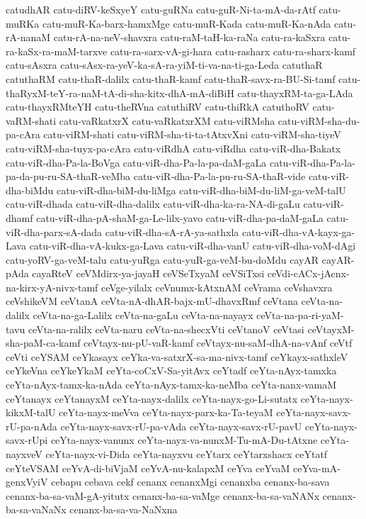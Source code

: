 {catudhAR
catu-diRV-keSxyeY
catu-guRNa
catu-guR-Ni-ta-mA-da-rAtf
catu-muRKa
catu-muR-Ka-barx-hamxMge
catu-muR-Kada
catu-muR-Ka-nAda
catu-rA-nanaM
catu-rA-na-neV-shavxra
catu-raM-taH-ka-raNa
catu-ra-kaSxra
catu-ra-kaSx-ra-maM-tarxve
catu-ra-sarx-vA-gi-hara
catu-rasharx
catu-ra-sharx-kamf
catu-sAsxra
catu-sAsx-ra-yeV-ka-sA-ra-yiM-ti-va-na-ti-ga-Leda
catuthaR
catuthaRM
catu-thaR-dalilx
catu-thaR-kamf
catu-thaR-savx-ra-BU-Si-tamf
catu-thaRyxM-teY-ra-naM-tA-di-sha-kitx-dhA-mA-diBiH
catu-thayxRM-ta-ga-LAda
catu-thayxRMteYH
catu-theRVna
catuthiRV
catu-thiRkA
catuthoRV
catu-vaRM-shati
catu-vaRkatxrX
catu-vaRkatxrXM
catu-viRMsha
catu-viRM-sha-du-pa-cAra
catu-viRM-shati
catu-viRM-sha-ti-ta-tAtxvXni
catu-viRM-sha-tiyeV
catu-viRM-sha-tuyx-pa-cAra
catu-viRdhA
catu-viRdha
catu-viR-dha-Bakatx
catu-viR-dha-Pa-la-BoVga
catu-viR-dha-Pa-la-pa-daM-gaLa
catu-viR-dha-Pa-la-pa-da-pu-ru-SA-thaR-veMba
catu-viR-dha-Pa-la-pu-ru-SA-thaR-vide
catu-viR-dha-biMdu
catu-viR-dha-biM-du-liMga
catu-viR-dha-biM-du-liM-ga-veM-talU
catu-viR-dhada
catu-viR-dha-dalilx
catu-viR-dha-ka-ra-NA-di-gaLu
catu-viR-dhamf
catu-viR-dha-pA-shaM-ga-Le-lilx-yavo
catu-viR-dha-pa-daM-gaLa
catu-viR-dha-parx-sA-dada
catu-viR-dha-sA-rA-ya-sathxla
catu-viR-dha-vA-kayx-ga-Lava
catu-viR-dha-vA-kukx-ga-Lava
catu-viR-dha-vanU
catu-viR-dha-voM-dAgi
catu-yoRV-ga-veM-talu
catu-yuRga
catu-yuR-ga-veM-bu-doMdu
cayAR
cayAR-pAda
cayaRteV
ceVMdirx-ya-jayaH
ceVSeTxyaM
ceVSiTxsi
ceVdi-cACx-jAcnx-na-kirx-yA-nivx-tamf
ceVge-yilalx
ceVnumx-kAtxnAM
ceVrama
ceVshavxra
ceVshikeVM
ceVtanA
ceVta-nA-dhAR-bajx-mU-dhavxRmf
ceVtana
ceVta-na-dalilx
ceVta-na-ga-Lalilx
ceVta-na-gaLu
ceVta-na-nayayx
ceVta-na-pa-ri-yaM-tavu
ceVta-na-ralilx
ceVta-naru
ceVta-na-shecxVti
ceVtanoV
ceVtasi
ceVtayxM-sha-paM-ca-kamf
ceVtayx-nu-pU-vaR-kamf
ceVtayx-nu-saM-dhA-na-vAnf
ceVtf
ceVti
ceYSAM
ceYkasayx
ceYka-va-satxrX-sa-ma-nivx-tamf
ceYkayx-sathxleV
ceYkeVna
ceYkeYkaM
ceYta-coCxV-Sa-yitAvx
ceYtadf
ceYta-nAyx-tamxka
ceYta-nAyx-tamx-ka-nAda
ceYta-nAyx-tamx-ka-neMba
ceYta-nanx-vamaM
ceYtanayx
ceYtanayxM
ceYta-nayx-dalilx
ceYta-nayx-go-Li-sutatx
ceYta-nayx-kikxM-talU
ceYta-nayx-meVva
ceYta-nayx-parx-ka-Ta-teyaM
ceYta-nayx-savx-rU-pa-nAda
ceYta-nayx-savx-rU-pa-vAda
ceYta-nayx-savx-rU-pavU
ceYta-nayx-savx-rUpi
ceYta-nayx-vanunx
ceYta-nayx-va-nunxM-Tu-mA-Du-tAtxne
ceYta-nayxveV
ceYta-nayx-vi-Dida
ceYta-nayxvu
ceYtarx
ceYtarxshacx
ceYtatf
ceYteVSAM
ceYvA-di-biVjaM
ceYvA-nu-kalapxM
ceYva
ceYvaM
ceYva-mA-genxVyiV
cebapu
cebava
cekf
cenanx
cenanxMgi
cenanxba
cenanx-ba-sava
cenanx-ba-sa-vaM-gA-yitutx
cenanx-ba-sa-vaMge
cenanx-ba-sa-vaNANx
cenanx-ba-sa-vaNaNx
cenanx-ba-sa-va-NaNxna
}

